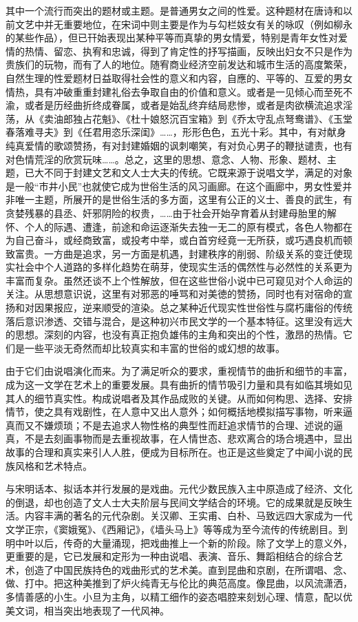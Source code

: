 其中一个流行而突出的题材或主题。是普通男女之间的性爱。这种题材在唐诗和以前文艺中并无重要地位，在宋词中则主要是作为与勾栏妓女有关的咏叹（例如柳永的某些作品），但已幵始表现出某种平等而真挚的男女情爱，特别是青年女性对爱情的热情、留恋、执宥和忠诚，得到了肯定性的抒写描画，反映出妇女不只是作为贵族们的玩物，而有了人的地位。随宥商业经济空前发达和城市生活的高度繁荣，自然生理的性爱题材日益取得社会性的意义和内容，自應的、平等的、互爱的男女情热，具有冲破重重封建礼俗去争取自由的价值和意义。或者是一见倾心而至死不渝，或者是历经曲折终成眷属，或者是始乱终弃结局悲惨，或者是肉欲横流追求淫荡，从《卖油郎独占花魁》、《杜十娘怒沉百宝箱》到《乔太守乱点弩鸯谱》、《玉堂春落难寻夫》到《任君用恣乐深闺》……，形形色色，五光十彩。其中，有对献身纯真爱情的歌颂赞扬，有对封建婚姻的讽刺嘲笑，有对负心男子的鞭挞谴责，也有对色情荒淫的欣赏玩味……。总之，这里的思想、意念、人物、形象、题材、主题，已大不同于封建文艺和文人士大夫的传统。它既来源于说唱文学，满足的对象是一般“市井小民”也就使它成为世俗生活的风习画廊。在这个画廊中，男女性爱并非唯一主题，所展开的是世俗生活的多方面，这里有公正的义士、善良的武生，有贪婪残暴的县丞、奸邪阴险的权贵，……由于社会开始孕育着从封建母胎里的解怀、个人的际遇、遭逢，前途和命运逐渐失去独一无二的原有模式，各色人物都在为自己奋斗，或经商致富，或投考中举，或白首穷经竟一无所获，或巧遇良机而顿致富贵。一方曲是追求，另一方面是机遇，封建秩序的削弱、阶级关系的变迁使现实社会中个人道路的多样化趋势在萌芽，使现实生活的偶然性与必然性的关系更为丰富而复杂。虽然还谈不上个性解放，但在这些世俗小说中已可窥见对个人命运的关注。从思想意识说，这里有对邪恶的唾骂和对美徳的赞扬，同时也有对宿命的宣扬和对因果报应，逆来顺受的渲染。总之某种近代现实性世俗性与腐朽庸俗的传统落后意识渗透、交错与混合，是这种初兴市民文学的一个基本特征。这里没有远大的思想。深刻的内容，也没有真正抱负雄伟的主角和突出的个性，激昂的热情。它们是一些平淡无奇然而却比较真实和丰富的世俗的或幻想的故事。

由于它们由说唱演化而来。为了满足听众的要求，重视情节的曲折和细节的丰富，成为这一文学在艺术上的重要发展。具有曲折的情节吸引力量和具有如临其境如见其人的细节真实性。构成说唱者及其作品成败的关键。从而如何构思、选择、安排情节，使之具有戏剧性，在人意中又出人意外；如何概括地模拟描写事物，听来逼真而又不嫌烦琐；不是去追求人物性格的典型性而赶追求情节的合理、述说的逼真，不是去刻画事物而是去重视故事，在人情世态、悲欢离合的场合境遇中，显出故事的合理和真实来引人人胜，便成为目标所在。也正是这些奠定了中闻小说的民族风格和艺术特点。

与宋明话本、拟话本并行发展的是戏曲。元代少数民族入主中原造成了经济、文化的倒退，却也创造了文人士大夫阶层与民间文学结合的环境。它的成果就是反映生活。内容丰满的著名的元代杂剧。关汉卿、王实甫、白朴、马致远四大家成为一代文学正宗，《窦娥冤》、《西厢记》，《墙头马上》等等成为至今流传的传统剧目。到明中叶以后，传奇的大量涌现，把戏曲推上一个新的阶段。除了文学上的意义外，更重要的是，它已发展和定形为一种由说唱、表演、音乐、舞蹈相结合的综合艺术，创造了中国民族持色的戏曲形式的艺术美。直到昆曲和京剧，在所谓唱、念、做、打中。把这种美推到了炉火纯青无与伦比的典范高度。像昆曲，以风流潇洒，多情善感的小生。小旦为主角，以精工细作的姿态唱腔来刻划心理、情意，配以优美文词，相当突出地表现了一代风神。

